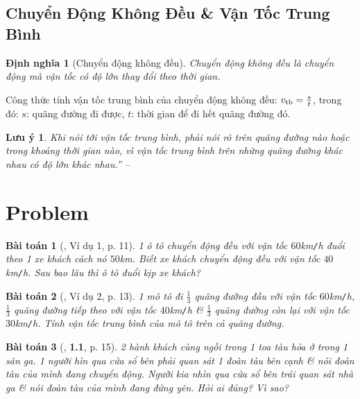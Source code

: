 \documentclass{article}
\numberwithin{equation}{section}
\newtheorem{dinhnghia}{Định nghĩa}[section]
\newtheorem{baitoan}{Bài toán}[section]
\newtheorem{luuy}{Lưu ý}[section]
\begin{document}
\subsection{Chuyển Động Không Đều \& Vận Tốc Trung Bình}

\begin{dinhnghia}[Chuyển động không đều]
	\emph{Chuyển động không đều} là chuyển động mà vận tốc có độ lớn thay đổi theo thời gian.
\end{dinhnghia}
Công thức tính vận tốc trung bình của chuyển động không đều: $v_{\rm tb} = \frac{s}{t}$, trong đó: $s$: quãng đường đi được, $t$: thời gian để đi hết quãng đường đó.

\begin{luuy}
	Khi nói tới vận tốc trung bình, phải nói rõ trên quãng đường nào hoặc trong khoảng thời gian nào, vì vận tốc trung bình trên những quãng đường khác nhau có độ lớn khác nhau.'' -- \cite[p. 5]{Thinh_Lua2021}
\end{luuy}


\section{Problem}

\begin{baitoan}[\cite{Thinh_Lua2021}, Ví dụ 1, p. 11]
	1 ô tô chuyển động đều với vận tốc $60$\emph{km\texttt{/}h} đuổi theo 1 xe khách cách nó $50$\emph{km}. Biết xe khách chuyển động đều với vận tốc $40$\emph{km\texttt{/}h}. Sau bao lâu thì ô tô đuổi kịp xe khách?
\end{baitoan}

\begin{baitoan}[\cite{Thinh_Lua2021}, Ví dụ 2, p. 13]
	1 mô tô đi $\frac{1}{3}$ quãng đường đầu với vận tốc $60$\emph{km\texttt{/}h}, $\frac{1}{3}$ quãng đường tiếp theo với vận tốc $40$\emph{km\texttt{/}h} \& $\frac{1}{3}$ quãng đường còn lại với vận tốc $30$\emph{km\texttt{/}h}. Tính vận tốc trung bình của mô tô trên cả quãng đường.
\end{baitoan}

\begin{baitoan}[\cite{Thinh_Lua2021}, \textbf{1.1}, p. 15]
	2 hành khách cùng ngồi trong 1 toa tàu hỏa ở trong 1 sân ga. 1 người hìn qua cửa sổ bên phải quan sát 1 đoàn tàu bên cạnh \& nói đoàn tàu của mình đang chuyển động. Người kia nhìn qua cửa sổ bên trái quan sát nhà ga \& nói đoàn tàu của mình đang đứng yên. Hỏi ai đúng? Vì sao?
\end{baitoan}
\end{document}

